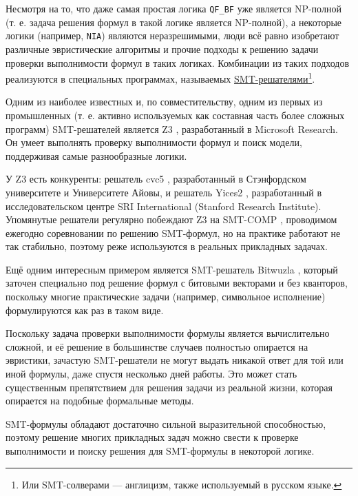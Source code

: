 
Несмотря на то, что даже самая простая логика \texttt{QF\_BF} уже является NP-полной (т. е. задача решения формул в такой логике является NP-полной), а некоторые логики (например, \texttt{NIA}) являются неразрешимыми, люди всё равно изобретают различные эвристические алгоритмы и прочие подходы к решению задачи проверки выполнимости формул в таких логиках. Комбинации из таких подходов реализуются в специальных программах, называемых \underline{SMT-решателями}\footnote{Или SMT-солверами --- англицизм, также используемый в русском языке.}.

Одним из наиболее известных и, по совместительству, одним из первых из промышленных (т. е. активно используемых как составная часть более сложных программ) SMT-решателей является Z3 \cite{z3-paper}, разработанный в Microsoft Research. Он умеет выполнять проверку выполнимости формул и поиск модели, поддерживая самые разнообразные логики.

У Z3 есть конкуренты: решатель cvc5 \cite{cvc5-paper}, разработанный в Стэнфордском университете и Университете Айовы, и решатель Yices2 \cite{yices2-paper}, разработанный в исследовательском центре SRI International (Stanford Research Institute). Упомянутые решатели регулярно побеждают Z3 на SMT-COMP \cite{smt-comp-paper} \cite{smt-comp-website}, проводимом ежегодно соревновании по решению SMT-формул, но на практике работают не так стабильно, поэтому реже используются в реальных прикладных задачах.

Ещё одним интересным примером является SMT-решатель Bitwuzla \cite{bitwuzla-paper}, который заточен специально под решение формул с битовыми векторами и без кванторов, поскольку многие практические задачи (например, символьное исполнение) формулируются как раз в таком виде.

Поскольку задача проверки выполнимости формулы является вычислительно сложной, и её решение в большинстве случаев полностью опирается на эвристики, зачастую SMT-решатели не могут выдать никакой ответ для той или иной формулы, даже спустя несколько дней работы. Это может стать существенным препятствием для решения задачи из реальной жизни, которая опирается на подобные формальные методы.


SMT-формулы обладают достаточно сильной выразительной способностью, поэтому решение многих прикладных задач можно свести к проверке выполнимости и поиску решения для SMT-формулы в некоторой логике.

